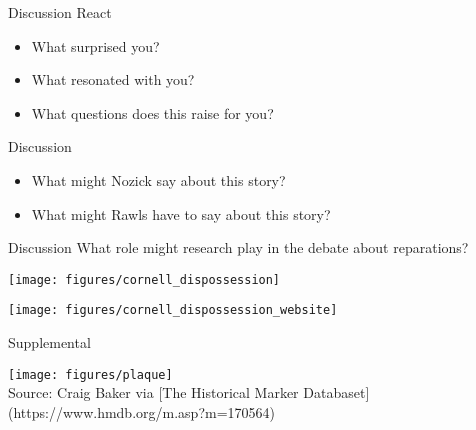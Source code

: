 \documentclass{beamer}
\newcommand\bref[2]{\href{#1}{\color{blue}{#2}}}
\begin{document}
\begin{frame}{Discussion}
React
\begin{itemize}
\item What surprised you?
\item What resonated with you?
\item What questions does this raise for you?
\end{itemize}
\end{frame}


\begin{frame}{Discussion}
\begin{itemize}
\item What might Nozick say about this story?
\item What might Rawls have to say about this story?
\end{itemize}
\end{frame}

\begin{frame}{Discussion}
What role might research play in the debate about reparations?
\end{frame}


\begin{frame}
\texttt{[image: figures/cornell\_dispossession]}
\end{frame}

\begin{frame}
\texttt{[image: figures/cornell\_dispossession\_website]} \\
\bref{https://blogs.cornell.edu/cornelluniversityindigenousdispossession/}{blogs.cornell.edu/cornelluniversityindigenousdispossession/}
\end{frame}

\begin{frame}
Supplemental
\end{frame}

\begin{frame}
\texttt{[image: figures/plaque]} \\
Source: Craig Baker via [The Historical Marker Databaset](https://www.hmdb.org/m.asp?m=170564)
\end{frame}
\end{document}
